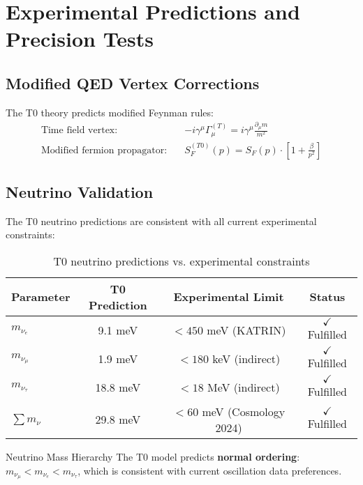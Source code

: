 \documentclass[12pt,a4paper]{article}
\begin{document}
	\section{Experimental Predictions and Precision Tests}
	\label{sec:experimental_predictions}
	

	\subsection{Modified QED Vertex Corrections}
	\label{subsec:qed_corrections}
	
	The T0 theory predicts modified Feynman rules:
	\begin{align}
		\text{Time field vertex:} \quad &-i\gamma^\mu\Gamma_\mu^{(T)} = i\gamma^\mu\frac{\partial_\mu m}{m^2} \\
		\text{Modified fermion propagator:} \quad &S_F^{(T0)}(p) = S_F(p) \cdot \left[1 + \frac{\beta}{p^2}\right]
	\end{align}
	
	\subsection{Neutrino Validation}
	\label{subsec:neutrino_validation}
	
	The T0 neutrino predictions are consistent with all current experimental constraints:
	
	\begin{table}[H]
		\centering
		\begin{tabular}{lccc}
			\toprule
			\textbf{Parameter} & \textbf{T0 Prediction} & \textbf{Experimental Limit} & \textbf{Status} \\
			\midrule
			$m_{\nu_e}$ & 9.1 meV & $< 450$ meV (KATRIN) & $\checkmark$ Fulfilled \\
			$m_{\nu_\mu}$ & 1.9 meV & $< 180$ keV (indirect) & $\checkmark$ Fulfilled \\
			$m_{\nu_\tau}$ & 18.8 meV & $< 18$ MeV (indirect) & $\checkmark$ Fulfilled \\
			$\sum m_\nu$ & 29.8 meV & $< 60$ meV (Cosmology 2024) & $\checkmark$ Fulfilled \\
			\bottomrule
		\end{tabular}
		\caption{T0 neutrino predictions vs. experimental constraints}
		\label{tab:neutrino_validation}
	\end{table}
	
	\begin{important}{Neutrino Mass Hierarchy}{}
		The T0 model predicts \textbf{normal ordering}: $m_{\nu_\mu} < m_{\nu_e} < m_{\nu_\tau}$, which is consistent with current oscillation data preferences.
	\end{important}
	
\end{document}

